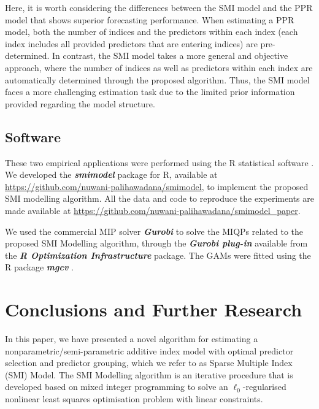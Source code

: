 \documentclass[
  11pt,
  a4paper,
]{article}
\begin{document}
Here, it is worth considering the differences between the SMI model and
the PPR model that shows superior forecasting performance. When
estimating a PPR model, both the number of indices and the predictors
within each index (each index includes all provided predictors that are
entering indices) are pre-determined. In contrast, the SMI model takes a
more general and objective approach, where the number of indices as well
as predictors within each index are automatically determined through the
proposed algorithm. Thus, the SMI model faces a more challenging
estimation task due to the limited prior information provided regarding
the model structure.

\subsection{Software}\label{software}

These two empirical applications were performed using the R statistical
software \autocite{Rcore}. We developed the \textbf{\emph{smimodel}}
package for R, available at
\url{https://github.com/nuwani-palihawadana/smimodel}, to implement the
proposed SMI modelling algorithm. All the data and code to reproduce the
experiments are made available at
\url{https://github.com/nuwani-palihawadana/smimodel_paper}.

We used the commercial MIP solver \textbf{\emph{Gurobi}}
\autocite{gurobi2023} to solve the MIQPs related to the proposed SMI
Modelling algorithm, through the \textbf{\emph{Gurobi plug-in}}
\autocite[ROI.plugin.gurobi,][]{Schwendinger2023} available from the
\textbf{\emph{R Optimization Infrastructure}}
\autocites[ROI,][]{Hornik2023,Theusl2020} package. The GAMs were fitted
using the R package \textbf{\emph{mgcv}} \autocite{mgcv,Wood2011}.

\section{Conclusions and Further Research}\label{sec-conclusion}

In this paper, we have presented a novel algorithm for estimating a
nonparametric/semi-parametric additive index model with optimal
predictor selection and predictor grouping, which we refer to as Sparse
Multiple Index (SMI) Model. The SMI Modelling algorithm is an iterative
procedure that is developed based on mixed integer programming to solve
an \(\ell_{0}\)-regularised nonlinear least squares optimisation problem
with linear constraints.
\end{document}
